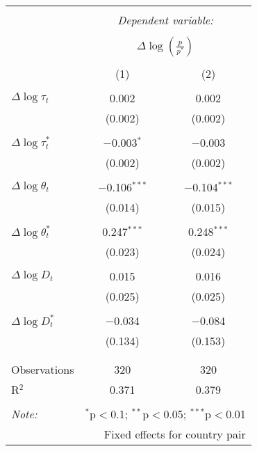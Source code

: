 
\begin{tabular}{@{\extracolsep{5pt}}lcc} 
\\[-1.8ex]\hline 
\hline \\[-1.8ex] 
 & \multicolumn{2}{c}{\textit{Dependent variable:}} \\ 
\cline{2-3} 
\\[-1.8ex] & \multicolumn{2}{c}{$\Delta \log \left(\frac{p}{p^*} \right)$} \\ 
\\[-1.8ex] & (1) & (2)\\ 
\hline \\[-1.8ex] 
 $\Delta \log \tau_t$ & 0.002 & 0.002 \\ 
  & (0.002) & (0.002) \\ 
  & & \\ 
 $\Delta \log \tau_t^*$ & $-$0.003$^{*}$ & $-$0.003 \\ 
  & (0.002) & (0.002) \\ 
  & & \\ 
 $\Delta \log \theta_t$ & $-$0.106$^{***}$ & $-$0.104$^{***}$ \\ 
  & (0.014) & (0.015) \\ 
  & & \\ 
 $\Delta \log \theta_t^*$ & 0.247$^{***}$ & 0.248$^{***}$ \\ 
  & (0.023) & (0.024) \\ 
  & & \\ 
 $\Delta \log D_t$ & 0.015 & 0.016 \\ 
  & (0.025) & (0.025) \\ 
  & & \\ 
 $\Delta \log D_t^*$ & $-$0.034 & $-$0.084 \\ 
  & (0.134) & (0.153) \\ 
  & & \\ 
\hline \\[-1.8ex] 
Observations & 320 & 320 \\ 
R$^{2}$ & 0.371 & 0.379 \\ 
\hline 
\hline \\[-1.8ex] 
\textit{Note:}  & \multicolumn{2}{r}{$^{*}$p$<$0.1; $^{**}$p$<$0.05; $^{***}$p$<$0.01} \\ 
 & \multicolumn{2}{r}{Fixed effects for country pair} \\ 
\end{tabular} 
